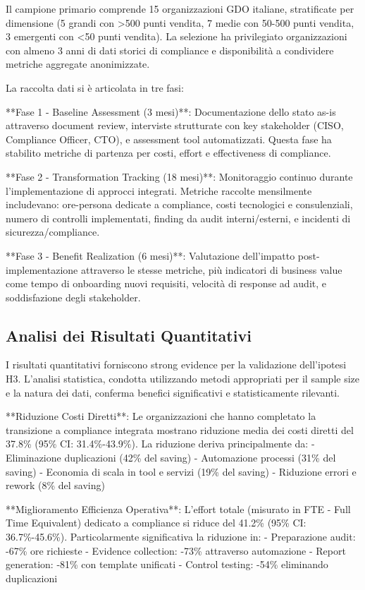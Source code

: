 Il campione primario comprende 15 organizzazioni GDO italiane, stratificate per dimensione (5 grandi con >500 punti vendita, 7 medie con 50-500 punti vendita, 3 emergenti con <50 punti vendita). La selezione ha privilegiato organizzazioni con almeno 3 anni di dati storici di compliance e disponibilità a condividere metriche aggregate anonimizzate.

La raccolta dati si è articolata in tre fasi:

**Fase 1 - Baseline Assessment (3 mesi)**: Documentazione dello stato as-is attraverso document review, interviste strutturate con key stakeholder (CISO, Compliance Officer, CTO), e assessment tool automatizzati. Questa fase ha stabilito metriche di partenza per costi, effort e effectiveness di compliance.

**Fase 2 - Transformation Tracking (18 mesi)**: Monitoraggio continuo durante l'implementazione di approcci integrati. Metriche raccolte mensilmente includevano: ore-persona dedicate a compliance, costi tecnologici e consulenziali, numero di controlli implementati, finding da audit interni/esterni, e incidenti di sicurezza/compliance.

**Fase 3 - Benefit Realization (6 mesi)**: Valutazione dell'impatto post-implementazione attraverso le stesse metriche, più indicatori di business value come tempo di onboarding nuovi requisiti, velocità di response ad audit, e soddisfazione degli stakeholder.

\subsection{Analisi dei Risultati Quantitativi}

I risultati quantitativi forniscono strong evidence per la validazione dell'ipotesi H3. L'analisi statistica, condotta utilizzando metodi appropriati per il sample size e la natura dei dati, conferma benefici significativi e statisticamente rilevanti.

**Riduzione Costi Diretti**: Le organizzazioni che hanno completato la transizione a compliance integrata mostrano riduzione media dei costi diretti del 37.8\% (95\% CI: 31.4\%-43.9\%). La riduzione deriva principalmente da:
- Eliminazione duplicazioni (42\% del saving)
- Automazione processi (31\% del saving)
- Economia di scala in tool e servizi (19\% del saving)
- Riduzione errori e rework (8\% del saving)

**Miglioramento Efficienza Operativa**: L'effort totale (misurato in FTE - Full Time Equivalent) dedicato a compliance si riduce del 41.2\% (95\% CI: 36.7\%-45.6\%). Particolarmente significativa la riduzione in:
- Preparazione audit: -67\% ore richieste
- Evidence collection: -73\% attraverso automazione
- Report generation: -81\% con template unificati
- Control testing: -54\% eliminando duplicazioni


